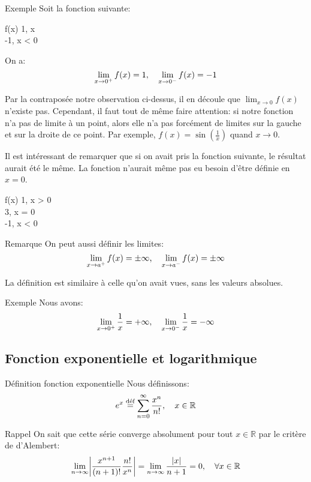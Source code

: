 \documentclass[a4paper]{article}
\begin{document}
\begin{parag}{Exemple}
    Soit la fonction suivante:
    \begin{functionbypart}{f\left(x\right)}
    1, \mathspace x  \\
    -1, \mathspace x < 0
    \end{functionbypart}

    On a: 
    \[\lim_{x \to 0^+} f\left(x\right) = 1, \mathspace \lim_{x \to 0^-} f\left(x\right) = -1\]

    Par la contraposée notre observation ci-dessus, il en découle que $\lim_{x \to 0} f\left(x\right)$ n'existe pas. Cependant, il faut tout de même faire attention: si notre fonction n'a pas de limite à un point, alors elle n'a pas forcément de limites sur la gauche et sur la droite de ce point. Par exemple, $f\left(x\right) = \sin\left(\frac{1}{x}\right)$ quand $x \to 0$.

    Il est intéressant de remarquer que si on avait pris la fonction suivante, le résultat aurait été le même. La fonction n'aurait même pas eu besoin d'être définie en $x = 0$.
    \begin{functionbypart}{f\left(x\right)}
    1, \mathspace x > 0 \\
    3, \mathspace x = 0 \\
    -1, \mathspace x < 0
    \end{functionbypart}
\end{parag}

\begin{parag}{Remarque}
    On peut aussi définir les limites: 
    \[\lim_{x \to a^+} f\left(x\right) = \pm \infty, \mathspace \lim_{x \to a^-} f\left(x\right) = \pm \infty\]
     
    La définition est similaire à celle qu'on avait vues, sans les valeurs absolues.
\end{parag}

\begin{parag}{Exemple}
    Nous avons: 
    \[\lim_{x \to 0^+} \frac{1}{x} = +\infty, \mathspace \lim_{x \to 0^-} \frac{1}{x} = -\infty\]
\end{parag}

\subsection{Fonction exponentielle et logarithmique}
\begin{parag}{Définition fonction exponentielle}
    Nous définissons: 
    \[e^x \over{=}{déf} \sum_{n=0}^{\infty} \frac{x^n}{n!}, \mathspace x \in \mathbb{R}\]

    \begin{subparag}{Rappel}
        On sait que cette série converge absolument pour tout $x \in \mathbb{R}$ par le critère de d'Alembert: 
        \[\lim_{n \to \infty} \left|\frac{x^{n+1}}{\left(n+1\right)!} \frac{n!}{x^n}\right| = \lim_{n \to \infty} \frac{\left|x\right|}{n + 1} = 0, \mathspace \forall x \in \mathbb{R}\]
        
    \end{subparag}
\end{parag}
\end{document}

